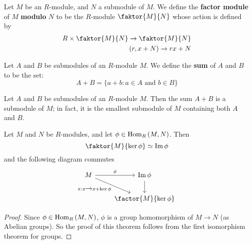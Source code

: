 \begin{definition}
  Let $M$ be an  $R$-module, and  $N$ a submodule of  $M$. We define
  the  \textbf{factor module} of $M$  \textbf{modulo} $N$ to be the
   $R$-module  $\faktor{M}{N}$ whose action is defined by
   \begin{equation}
     \begin{aligned}
       R \times \faktor{M}{N} \xrightarrow{} \faktor{M}{N}  \\
       (r,x+N)  \xrightarrow{} rx+N \\
     \end{aligned}
   \end{equation}
\end{definition}

\begin{definition}
  Let $A$ and  $B$ be submodules of an  $R$-module  $M$. We define the
   \textbf{sum} of $A$ and $B$ to be the set:
   \begin{equation*}
     A+B=\{ a+b : a \in A \text{ and } b \in B \}
   \end{equation*}
\end{definition}

\begin{proposition}\label{proposition_4.3.2}
  Let $A$ and  $B$ be submodules of an  $R$-module  $M$. Then the sum
  $A+B$ is a submodule of $M$; in fact, it is the smallest submodule
  of  $M$ containing both  $A$ and  $B$.
\end{proposition}

\begin{theorem}\label{theorem_4.3.3}
  Let $M$ and  $N$ be  $R$-modules, and let  $\phi \in \operatorname{Hom}_R{(M,N)}$.
  Then
  \begin{equation*}
    \faktor{M}{\ker{\phi}} \simeq \im{\phi}
  \end{equation*}
  and the following diagram commutes
  \[\begin{tikzcd}
    M & {\im{\phi}} \\
      & {\factor{M}{\ker{\phi}}}
      \arrow["\phi", from=1-1, to=1-2]
      \arrow["{\pi:x \xrightarrow{} x+\ker{\phi}}"', from=1-1, to=2-2]
      \arrow[from=1-2, to=2-2]
  \end{tikzcd}\]
\end{theorem}
\begin{proof}
  Since $\phi \in \operatorname{Hom}_R{(M,N)}$, $\phi$ is a group homomorphism of
  $M \xrightarrow{} N$ (as Abelian groups). So the proof of this
  theorem follows from the first isomorphism theorem for groups.
\end{proof}

